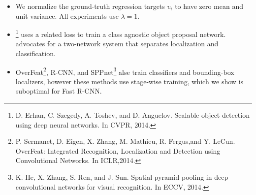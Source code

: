 \documentclass[11pt]{book}
\begin{document}
\begin{itemize}
\begin{itemize}
\begin{equation}
         smooth_{L_1}(x) = 
       \begin{cases}
       {0.5x^2} &\mbox{if |x| < 1}\\
       {|x| - 0.5} &\mbox{otherwise}
       \end{cases}
       \end{equation}
       is a robust $L_1$ loss that is less sensitive to outliers than the $L_2$ loss used in 
       R-CNN and SPPnet.
\begin{itemize}
\item When the regression targets are unbounded, training with $L_2$ loss can require careful
         tuning of learning rates in order to prevent exploding gradients. Eq.3 eliminates this
         sensitivity.
\end{itemize}
\item We normalize the ground-truth regression targets $v_i$ to have zero mean and unit variance.
       All experiments use $\lambda = 1$.
\item \footnote{D. Erhan, C. Szegedy, A. Toshev, and D. Anguelov. 
Scalable object detection using deep neural networks. In CVPR, 2014.
 } uses a related loss to train a class agnostic object proposal network. \footnotemark[2] advocates
       for a two-network system that separates localization and classification.
\item OverFeat\footnote{P. Sermanet,  D. Eigen,  X. Zhang,  M. Mathieu,  R. Fergus,and Y. LeCun.  
OverFeat: Integrated Recognition, Localization and Detection using Convolutional Networks.  
In ICLR,2014.
 }, R-CNN\footnotemark[1], and SPPnet\footnote{K. He, X. Zhang, S. Ren, and J. Sun. 
Spatial pyramid pooling in  deep  convolutional  networks  for  visual  recognition.   
In ECCV, 2014.
 } alse train classifiers and bounding-box 
       localizers, however these methods use stage-wise training, which we show is suboptimal
       for Fast R-CNN.
\end{itemize}



\end{itemize}
\end{document}
